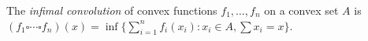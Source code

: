 The \emph{infimal convolution} of convex functions $f_1, \ldots, f_n$ on a convex set $A$ is $(f_1 \square \cdots \square f_n)(x) = \inf\{\sum_{i=1}^{n} f_i(x_i) : x_i \in A, \sum x_i = x\}$.

